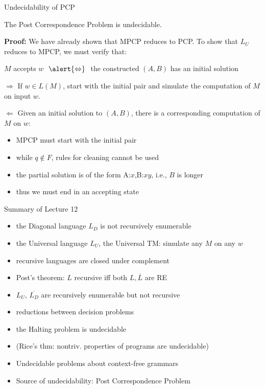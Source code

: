 \documentclass[handout]{beamer}
\begin{document}
    
\begin{frame}{Undecidability of PCP}
    
    \begin{theorem}
        The Post Correspondence Problem is undecidable.
    \end{theorem}    
    \textbf{Proof:} We have already shown that MPCP reduces to PCP. To show that $L_U$ reduces to MPCP, we must verify that:
    
    $M$ accepts $w$ $\ \alert{\Leftrightarrow}\ $ the constructed $(A,B)$ has an initial solution

    \alert{$\Rightarrow$} If $w\in L(M)$, start with the initial pair and simulate the computation of $M$ on input $w$.  

    \alert{$\Leftarrow $} Given an initial solution to $(A,B)$, there is a corresponding computation of $M$ on $w$:
    \vspace{-3pt}
    \begin{itemize}
        \item MPCP must start with the initial pair
        \item while $q\notin F$, rules for cleaning cannot be used
        \item the partial solution is of the form A:$x$,B:$xy$, i.e., $B$ is longer
        \item thus we must end in an accepting state\hfill\qedsymbol
    \end{itemize}

\end{frame}


\begin{frame}{Summary of Lecture 12}

    \begin{itemize}
        \item the Diagonal language $L_D$ is not recursively enumerable
        \item the Universal language $L_U$, the Universal TM: simulate any $M$ on any $w$
        \item recursive languages are closed under complement
        \item Post's theorem: $L$ recursive iff both $L,\overline{L}$ are RE
        \item $L_U$, $\overline{L_D}$ are recursively enumerable but not recursive
        \item reductions between decision problems
        \item the Halting problem is undecidable        
        \item (Rice's thm: nontriv. properties of programs are undecidable)
        \item Undecidable problems about context-free grammars
        \item Source of undecidability: Post Correspondence Problem
    \end{itemize}

\end{frame}
\end{document}
